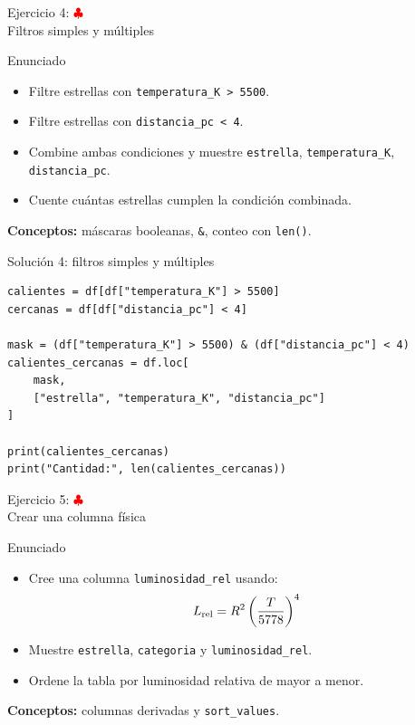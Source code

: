 \documentclass[10pt]{beamer}
\begin{document}
\begin{frame}{Ejercicio 4: \hfill \textcolor{red}{$\clubsuit$} \\ Filtros simples y múltiples}
  \begin{block}{Enunciado}
    \begin{itemize}
      \item Filtre estrellas con \texttt{temperatura\_K > 5500}.
      \item Filtre estrellas con \texttt{distancia\_pc < 4}.
      \item Combine ambas condiciones y muestre \texttt{estrella}, \texttt{temperatura\_K}, \texttt{distancia\_pc}.
      \item Cuente cuántas estrellas cumplen la condición combinada.
    \end{itemize}
  \end{block}
  \textbf{Conceptos:} máscaras booleanas, \texttt{\&}, conteo con \texttt{len()}.
\end{frame}

\begin{solutionblock}
\begin{frame}[fragile,shrink=5]{Solución 4: filtros simples y múltiples}
\begin{verbatim}
calientes = df[df["temperatura_K"] > 5500]
cercanas = df[df["distancia_pc"] < 4]

mask = (df["temperatura_K"] > 5500) & (df["distancia_pc"] < 4)
calientes_cercanas = df.loc[
    mask,
    ["estrella", "temperatura_K", "distancia_pc"]
]

print(calientes_cercanas)
print("Cantidad:", len(calientes_cercanas))
\end{verbatim}
\end{frame}
\end{solutionblock}

\begin{frame}{Ejercicio 5: \hfill \textcolor{red}{$\clubsuit$} \\ Crear una columna física}
  \begin{block}{Enunciado}
    \begin{itemize}
      \item Cree una columna \texttt{luminosidad\_rel} usando:
      \[
      L_{\rm rel}=R^2\left(\frac{T}{5778}\right)^4
      \]
      \item Muestre \texttt{estrella}, \texttt{categoria} y \texttt{luminosidad\_rel}.
      \item Ordene la tabla por luminosidad relativa de mayor a menor.
    \end{itemize}
  \end{block}
  \textbf{Conceptos:} columnas derivadas y \texttt{sort\_values}.
\end{frame}
\end{document}
